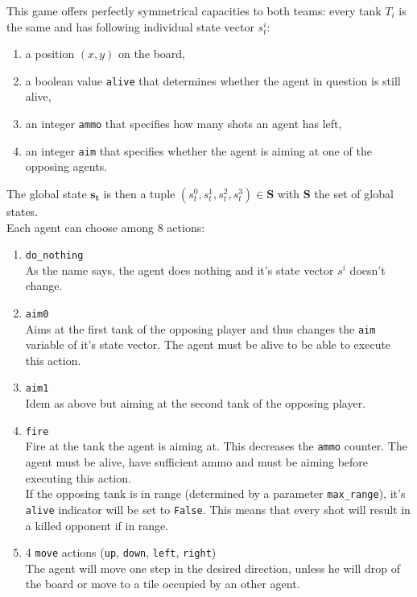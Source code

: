 This game offers perfectly symmetrical capacities to both teams: every tank $T_i$ is the same and has following individual state vector $s^i_t$:
\begin{enumerate}
    \item a position $(x,y)$ on the board,
    \item a boolean value {\tt alive} that determines whether the agent in question is still alive,
    \item an integer {\tt ammo} that specifies how many shots an agent has left,
    \item an integer {\tt aim} that specifies whether the agent is aiming at one of the opposing agents.
\end{enumerate}
The global state $\bm{s_t}$ is then a tuple $(s_t^0, s_t^1, s_t^2, s_t^3) \in \bm{S}$ with $\bm{S}$ the set of global states.\\
Each agent can choose among $8$ actions:
\begin{enumerate}
    \item {\tt do\_nothing}\\
        As the name says, the agent does nothing and it's state vector $s^i$ doesn't change.
    \item {\tt aim0} \\
        Aims at the first tank of the opposing player and thus changes the {\tt aim} variable of it's state vector. The agent must be alive to be able to execute this action.
    \item {\tt aim1} \\
        Idem as above but aiming at the second tank of the opposing player.
    \item {\tt fire} \\
        Fire at the tank the agent is aiming at. This decreases the {\tt ammo} counter. The agent must be alive, have sufficient ammo and must be aiming before executing this action.\\
        If the opposing tank is in range (determined by a parameter {\tt max\_range}), it's {\tt alive} indicator will be set to {\tt False}. This means that every shot will result in a killed opponent if in range.
    \item 4 {\tt move} actions ({\tt up}, {\tt down}, {\tt left}, {\tt right})\\
        The agent will move one step in the desired direction, unless he will drop of the board or move to a tile occupied by an other agent.
\end{enumerate}

